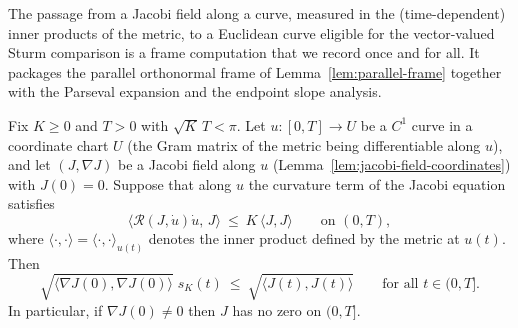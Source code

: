The passage from a Jacobi field along a curve, measured in the
(time-dependent) inner products of the metric, to a Euclidean curve
eligible for the vector-valued Sturm comparison is a frame computation
that we record once and for all. It packages the parallel orthonormal
frame of Lemma~\ref{lem:parallel-frame} together with the Parseval
expansion and the endpoint slope analysis.

\begin{lemma}
\label{lem:jacobi-frame-reduction}
\leanok
Fix $K\ge0$ and $T>0$ with $\sqrt K\,T<\pi$. Let $u\colon[0,T]\to U$ be a
$C^1$ curve in a coordinate chart $U$ (the Gram matrix of the metric being
differentiable along $u$), and let $(J,\nabla J)$ be a Jacobi field along
$u$ (Lemma~\ref{lem:jacobi-field-coordinates}) with $J(0)=0$. Suppose that
along $u$ the curvature term of the Jacobi equation satisfies
$$\langle{\mathcal R}(J,\dot u)\dot u,\,J\rangle\ \le\ K\,\langle J,J\rangle
\qquad\text{on }(0,T),$$
where $\langle\cdot,\cdot\rangle=\langle\cdot,\cdot\rangle_{u(t)}$ denotes
the inner product defined by the metric at $u(t)$. Then
$$\sqrt{\langle\nabla J(0),\nabla J(0)\rangle}\;s_K(t)\ \le\
\sqrt{\langle J(t),J(t)\rangle}\qquad\text{for all }t\in(0,T].$$
In particular, if $\nabla J(0)\not=0$ then $J$ has no zero on $(0,T]$.
\end{lemma}


